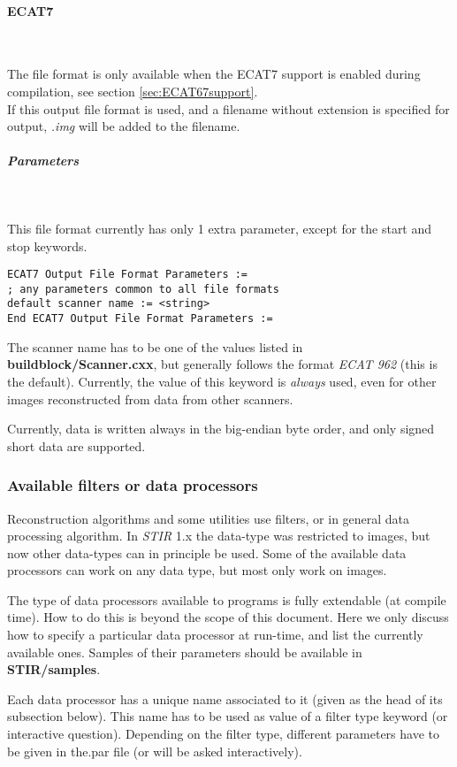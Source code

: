 \documentclass{article}
\newcommand{\subsubsubsection}[1]{\paragraph{#1}\mbox{} \\}
\newcommand{\subsubsubsubsection}[1]{\subparagraph{#1} \mbox{} \\}
\begin{document}
{{{{ \subsubsubsection{ECAT7}
}
The file format is only available when the ECAT7 support is enabled 
during compilation, see section \ref{sec:ECAT67support}.\\
If this output file format is used, and a filename without extension 
is specified for output, \textit{.img} will be added to the filename.

{ \subsubsubsubsection{Parameters}
}
This file format currently has only 1 extra parameter, except 
for the start and stop keywords.

\begin{verbatim}
ECAT7 Output File Format Parameters :=
; any parameters common to all file formats
default scanner name := <string>
End ECAT7 Output File Format Parameters :=
\end{verbatim}

The scanner name has to be one of the values listed in \textbf{buildblock/Scanner.cxx}, 
but generally follows the format \textit{ECAT 962} (this is the default). 
Currently, the value of this keyword is \textit{always} used, even 
for other images reconstructed from data from other scanners.


Currently, data is written always in the big-endian byte order, 
and only signed short data are supported.



\subsubsection{
Available filters or data processors}
\label{sec:filters}
Reconstruction algorithms and some utilities use filters, or in 
general data processing algorithm. In \textit{STIR} 1.x the data-type was restricted
to images, but now other data-types can in principle be used. Some
of the available data processors can work on any data type, but most
only work on images.

The type of data processors 
available to programs is fully extendable (at compile time). 
How to do this is beyond the scope of this document. Here we 
only discuss how to specify a particular data processor at run-time, 
and list the currently available ones. Samples of their parameters 
should be available in \textbf{STIR/samples}.


Each data processor has a unique name associated to it (given 
as the head of its subsection below). This name has to be used 
as value of a filter type keyword (or interactive question). 
Depending on the filter type, different parameters have to be 
given in the.par file (or will be asked interactively).


}}}
\end{document}
